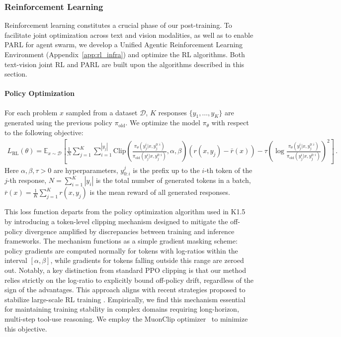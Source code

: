\documentclass{article}
\newcommand{\citep}[1]{\parencite{#1}}
\begin{document}
\subsubsection{Reinforcement Learning}
Reinforcement learning constitutes a crucial phase of our post-training. 
To facilitate joint optimization across text and vision modalities, as well as to enable PARL for agent swarm, we develop a Unified Agentic Reinforcement Learning Environment (Appendix~\ref{app:rl_infra}) and optimize the RL algorithms. 
Both text-vision joint RL and PARL are built upon the algorithms described in this section.
\paragraph{Policy Optimization}
For each problem $x$ sampled from a dataset $\mathcal{D}$, $K$ responses $\{y_1,\dots,y_K\}$ are generated using the previous policy $\pi_{\mathrm{old}}$.
We optimize the model $\pi_\theta$ with respect to the following objective: 
\begin{align}
L_{\mathrm{RL}}(\theta) = \mathbb{E}_{x \sim\mathcal{D}}
\left[ \frac{1}{N} \sum_{j=1}^K \sum_{i=1}^{|y_j|}
\mathrm{Clip}
\left(
\frac{\pi_{\theta}(y_j^i | x, y_j^{0:i})}{\pi_{\mathrm{old}}(y_j^i | x, y_j^{0:i}) }, \alpha, \beta
\right)
({r}(x, y_j) - \bar{r}(x))- \tau \left( \log \frac{\pi_{\theta}(y_j^i | x, y_j^{0:i})}{\pi_{\mathrm{old}}(y_j^i | x, y_j^{0:i}) } \right)^2
\right]
\, .
\label{eq:rl-objective}
\end{align}
Here $\alpha, \beta, \tau >0$ are hyperparameters, 
$y^j_{0:i}$ is the prefix up to the $i$-th token of the $j$-th response, 
$N=\sum_{i=1}^{K} |y_i|$ is the total number of generated tokens in a batch, 
$\bar{r}(x) = \frac{1}{K}\sum_{j=1}^K r(x, y_j)$ is the mean reward of all generated responses.   

This loss function departs from the policy optimization algorithm used in K1.5~\citep{team2025kimi} by introducing a token-level clipping mechanism designed to mitigate the off-policy divergence amplified by discrepancies between training and inference frameworks. 
The mechanism functions as a simple gradient masking scheme: policy gradients are computed normally for tokens with log-ratios within the interval $[\alpha, \beta]$, while gradients for tokens falling outside this range are zeroed out. 
Notably, a key distinction from standard PPO clipping \citep{schulman2017proximal} is that our method relies strictly on the log-ratio to explicitly bound off-policy drift, regardless of the sign of the advantages. 
This approach aligns with recent strategies proposed to stabilize large-scale RL training \citep{yao2025offpolicy, IcePop2025}. 
Empirically, we find this mechanism essential for maintaining training stability in complex domains requiring long-horizon, multi-step tool-use reasoning.
We employ the MuonClip optimizer~\citep{jordan2024muon,liu2025muon} to minimize this objective. 
\end{document}
